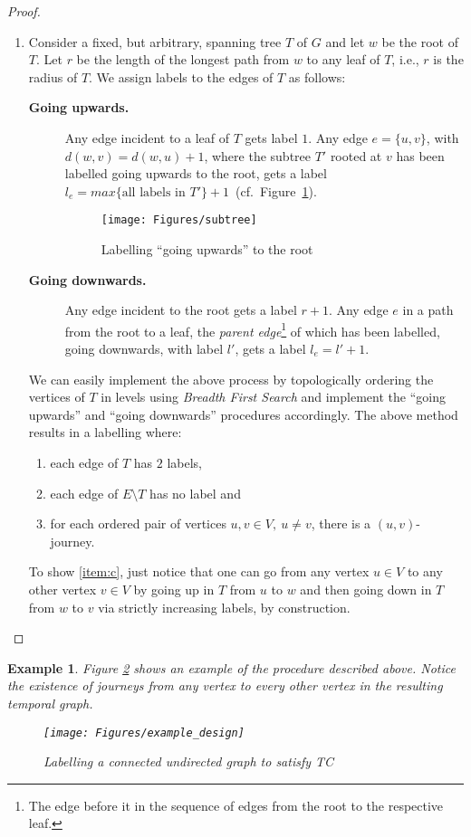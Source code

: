 \documentclass[a4paper,UKenglish]{article}
\newtheorem*{example*}{Example}
\begin{document}
\begin{proof}
\begin{enumerate}[label=(\alph*)]
\item\label{item:labelling} Consider a fixed, but arbitrary, spanning tree $T$ of $G$ and let $w$ be the root of $T$. Let $r$ be the length of the longest path from $w$ to any leaf of $T$, i.e., $r$ is the radius of $T$. We assign labels to the edges of $T$ as follows:
\begin{description}
\item[\textbf{Going upwards.}] Any edge incident to a leaf of $T$ gets label $1$. Any edge $e=\{u,v\}$, with $d(w,v) = d(w,u)+1$, where the subtree $T'$ rooted at $v$ has been labelled going upwards to the root, gets a label $l_e=max\{ \text{all labels in } T' \}+1$~(cf.~Figure~\ref{fig:subtree}).
\begin{figure}[!htb]
\centering
\texttt{[image: Figures/subtree]}
\caption{Labelling ``going upwards'' to the root}
\label{fig:subtree}
\end{figure}
\item[\textbf{Going downwards.}] Any edge incident to the root gets a label $r+1$. Any edge $e$ in a path from the root to a leaf, the \emph{parent edge}\footnote{The edge before it in the sequence of edges from the root to the respective leaf.} of which has been labelled, going downwards, with label $l'$, gets a label $l_e = l'+1$.
\end{description}
We can easily implement the above process by topologically ordering the vertices of $T$ in levels using \emph{Breadth First Search} and implement the ``going upwards'' and ``going downwards'' procedures accordingly. The above method results in a labelling where:
\begin{enumerate}[label=\arabic*., ref=\arabic*]
\item each edge of $T$ has $2$ labels,
\item each edge of $E\setminus T$ has no label and
\item\label{item:c} for each ordered pair of vertices $u,v\in V,~u\not=v$, there is a $(u,v)$-journey.
\end{enumerate}
To show \ref{item:c}, just notice that one can go from any vertex $u\in V$ to any other vertex $v \in V$ by going up in $T$ from $u$ to $w$ and then going down in $T$ from $w$ to $v$ via strictly increasing labels, by construction.
\end{enumerate}
\end{proof}

\begin{example*} Figure \ref{fig:example} shows an example of the procedure described above. Notice the existence of journeys from any vertex to every other vertex in the resulting temporal graph.
\begin{figure}[!htb]
\centering
\texttt{[image: Figures/example\_design]}
\caption{Labelling a connected undirected graph to satisfy TC}
\label{fig:example}
\end{figure}
\end{example*}
\end{document}
